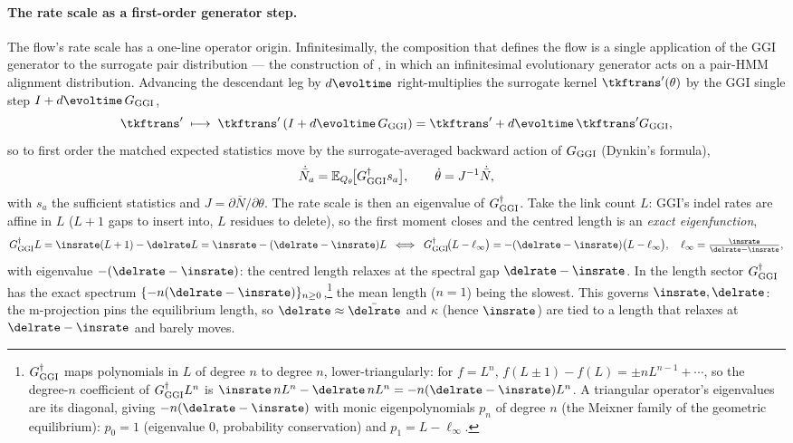 \paragraph{The rate scale as a first-order generator step.}
The flow's rate scale has a one-line operator origin.  Infinitesimally, the
composition that defines the flow is a single application of the GGI generator to
the surrogate pair distribution --- the construction of \cite[Fig.~3]{Holmes2020},
in which an infinitesimal evolutionary generator acts on a pair-HMM alignment
distribution.  Advancing the descendant leg by $d\evoltime$ right-multiplies the
surrogate kernel $\tkftrans'(\theta)$ by the GGI single step
$I+d\evoltime\,\ggigen$,
\begin{equation}
\label{eq:ggi-step}
\tkftrans'\;\longmapsto\;\tkftrans'\,(I+d\evoltime\,\ggigen)
   =\tkftrans'+d\evoltime\,\tkftrans'\ggigen,
\end{equation}
so to first order the matched expected statistics move by the surrogate-averaged
backward action of $G_{\mathrm{GGI}}$ (Dynkin's formula),
\begin{equation}
\label{eq:ggi-dynkin}
\dot{\bar N}_a=\mathbb E_{Q_\theta}\!\big[G_{\mathrm{GGI}}^{\dagger}s_a\big],
\qquad\dot\theta=J^{-1}\dot{\bar N},
\end{equation}
with $s_a$ the sufficient statistics and $J=\partial\bar N/\partial\theta$.  The
rate scale is then an eigenvalue of $G_{\mathrm{GGI}}^{\dagger}$.  Take the link count
$L$: GGI's indel rates are affine in $L$ ($L{+}1$ gaps to insert into, $L$
residues to delete), so the first moment closes and the centred length is an
\emph{exact eigenfunction},
\begin{equation}
\label{eq:ggi-eigenmode}
\ggigen^{\dagger}L=\insrate(L+1)-\delrate L=\insrate-(\delrate-\insrate)L
\;\;\Longleftrightarrow\;\;
\ggigen^{\dagger}\!\big(L-\ell_\infty\big)=-(\delrate-\insrate)\big(L-\ell_\infty\big),
\quad\ell_\infty=\tfrac{\insrate}{\delrate-\insrate},
\end{equation}
with eigenvalue $-(\delrate-\insrate)$: the centred length relaxes at the spectral
gap $\delrate-\insrate$.  In the length sector $G_{\mathrm{GGI}}^{\dagger}$ has the exact
spectrum $\{-n(\delrate-\insrate)\}_{n\ge0}$,\footnote{$G_{\mathrm{GGI}}^{\dagger}$ maps
polynomials in $L$ of degree $n$ to degree $n$, lower-triangularly: for $f=L^n$,
$f(L{\pm}1)-f(L)=\pm nL^{n-1}+\cdots$, so the degree-$n$ coefficient of
$G_{\mathrm{GGI}}^{\dagger}L^n$ is $\insrate\,nL^n-\delrate\,nL^n=-n(\delrate-\insrate)L^n$.
A triangular operator's eigenvalues are its diagonal, giving
$-n(\delrate-\insrate)$ with monic eigenpolynomials $p_n$ of degree $n$ (the
Meixner family of the geometric equilibrium): $p_0=1$ (eigenvalue $0$, probability
conservation) and $p_1=L-\ell_\infty$.} the mean length ($n{=}1$) being the
slowest.  This governs $\insrate,\delrate$: the m-projection pins the equilibrium
length, so $\delrate\approx\bar\delrate$ and $\kappa$ (hence $\insrate$) are tied
to a length that relaxes at $\delrate-\insrate$ and barely moves.

